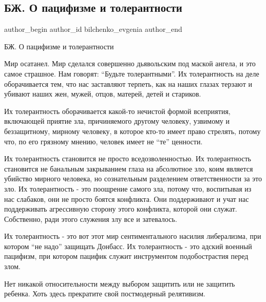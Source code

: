  
 
 
 
 
 
\subsection{БЖ. О пацифизме и толерантности}
\label{sec:19_02_2022.tg.bilchenko_evgenia.1.pacifizm_tolerantnost}
 
\ifcmt
 author_begin
   author_id bilchenko_evgenia
 author_end
\fi

БЖ. О пацифизме и толерантности

Мир осатанел. Мир сделался совершенно дьявольским под маской ангела, и это
самое страшное. Нам говорят: \enquote{Будьте толерантными}. Их толерантность на деле
оборачивается тем, что нас заставляют терпеть, как на наших глазах терзают и
убивают наших жен, мужей, отцов, матерей, детей и стариков.


Их толерантность оборачивается какой-то нечистой формой всеприятия, включающей
приятие зла, причиняемого другому человеку, узвимому и беззащитному, мирному
человеку, в которое кто-то имеет право стрелять, потому что, по его грязному
мнению, человек имеет не \enquote{те} ценности. 

Их толерантность становится не просто вседозволенностью. Их толерантность
становится не банальным закрыванием глаза на абсолютное зло, коим является
убийство мирного человека, но сознательным разделением ответственности за это
зло. Их толерантность - это поощрение самого зла, потому что, воспитывая из нас
слабаков, они не просто боятся конфликта. Они поддерживают и учат нас
поддерживать агрессивную сторону этого конфликта, которой они служат.
Собственно, ради этого служения злу все и затевалось.

Их толерантность - это вот этот мир сентиментального насилия либерализма, при
котором \enquote{не надо} защищать Донбасс. Их толерантность - это адский
военный пацифизм, при котором пацифик служит инструментом подобострастия перед
злом.

Нет никакой относительности между выбором защитить или не защитить ребенка.
Хоть здесь прекратите свой постмодерный релятивизм.
